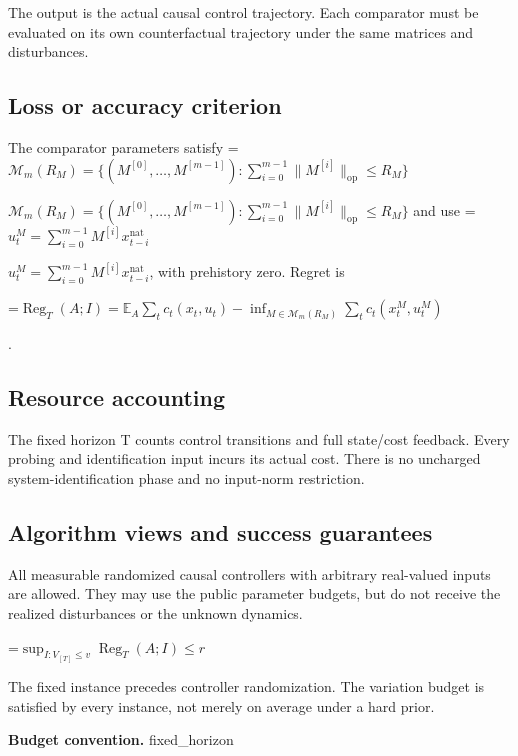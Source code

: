 \documentclass[10pt,a4paper]{article}
\newcommand{\AtlasMath}[1]{\par\begingroup\centering\setbox0=\hbox{$\displaystyle #1$}\ifdim\wd0>1.4\linewidth\typeout{ATLAS WIDE FORMULA: \the\wd0}\fi\ifdim\wd0>\linewidth\resizebox{\linewidth}{!}{\box0}\else\box0\fi\par\endgroup}
\newcommand{\AtlasInlineMath}[1]{\begingroup\setbox0=\hbox{$#1$}\ifdim\wd0>.4\linewidth\endgroup\AtlasMath{#1}\else\endgroup$#1$\fi}
\begin{document}
The output is the actual causal control trajectory. Each comparator must be evaluated on its own counterfactual trajectory under the same matrices and disturbances.



\subsection{Loss or accuracy criterion}


The comparator parameters satisfy \AtlasInlineMath{\mathcal M_m(R_M)=\{(M^{[0]},\ldots,M^{[m-1]}):\sum_{i=0}^{m-1}\|M^{[i]}\|_{\mathrm{op}}\le R_M\}} and use \AtlasInlineMath{u_t^M=\sum_{i=0}^{m-1}M^{[i]}x_{t-i}^{\mathrm{nat}}}, with prehistory zero. Regret is
\AtlasMath{\operatorname{Reg}_T(A;I)=\mathbb E_A\sum_t c_t(x_t,u_t)-\inf_{M\in\mathcal M_m(R_M)}\sum_t c_t(x_t^M,u_t^M)}
.



\subsection{Resource accounting}


The fixed horizon T counts control transitions and full state/cost feedback. Every probing and identification input incurs its actual cost. There is no uncharged system-identification phase and no input-norm restriction.



\subsection{Algorithm views and success guarantees}


All measurable randomized causal controllers with arbitrary real-valued inputs are allowed. They may use the public parameter budgets, but do not receive the realized disturbances or the unknown dynamics.




\AtlasMath{\sup_{I:V_{[T]}\le v}\operatorname{Reg}_T(A;I)\le r}




The fixed instance precedes controller randomization. The variation budget is satisfied by every instance, not merely on average under a hard prior.



\textbf{Budget convention.} fixed\_horizon
\end{document}
